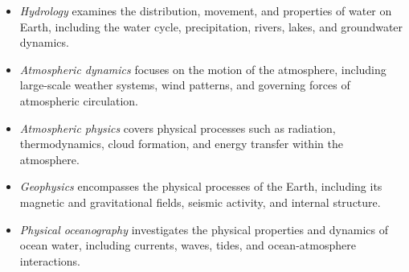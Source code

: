 \begin{itemize}[topsep=5pt, leftmargin=1em]
\vspace{-0.5em}
\item \textit{Hydrology} examines the distribution, movement, and properties of water on Earth, including the water cycle, precipitation, rivers, lakes, and groundwater dynamics. %

\vspace{-0.35em}
\item \textit{Atmospheric dynamics} focuses on the motion of the atmosphere, including large-scale weather systems, wind patterns, and governing forces of atmospheric circulation.%

\vspace{-0.35em}
\item \textit{Atmospheric physics} covers physical processes such as radiation, thermodynamics, cloud formation, and energy transfer within the atmosphere. %

\vspace{-0.35em}
\item \textit{Geophysics} encompasses the physical processes of the Earth, including its magnetic and gravitational fields, seismic activity, and internal structure.%

\vspace{-0.35em}
\item \textit{Physical oceanography} investigates the physical properties and dynamics of ocean water, including currents, waves, tides, and ocean-atmosphere interactions.
\vspace{-0.5em}
\end{itemize}




